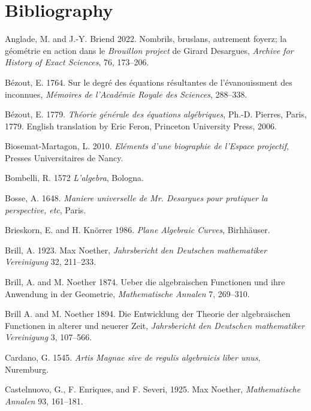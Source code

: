 \section*{Bibliography}
\def\newline{\par\hangindent=10pt\hangafter=1}
\parindent=0pt %
\small
\newline
\indent Anglade, M. and J.-Y. Briend 2022. Nombrils, bruslans, autrement foyerz; la g\'eom\'etrie en action dans le \emph{Brouillon project} de Girard Desargues, \emph{Archive for History of Exact Sciences}, 76, 173--206.
\newline\indent B\'ezout, E. 1764. Sur le degr\'e des \'equations r\'esultantes de l'\'evanouissment des inconnues, \emph{M\'emoires de l'Acad\'emie Royale des Sciences}, 288--338.
\newline\indent B\'ezout, E. 1779. \emph{Th\'eorie g\'en\'erale des \'equations alg\'ebriques}, Ph.-D. Pierres, Paris, 1779. English translation by Eric Feron, Princeton University Press, 2006.
\newline\indent  Biosemat-Martagon, L. 2010. \emph{El\'ements d'une biographie de l'Espace projectif}, Presses Universitaires de Nancy.
\newline\indent Bombelli, R. 1572 \emph{L'algebra}, Bologna.
\newline\indent Bosse, A.  1648. \emph{Maniere universelle de Mr. Desargues pour pratiquer la perspective, etc}, Paris.
\newline\indent Brieskorn, E. and  H. Kn\"orrer 1986. \emph{Plane Algebraic Curves}, Birhh\"auser.
\newline\indent Brill, A. 1923. Max Noether, \emph{Jahrsbericht den Deutschen mathematiker Vereinigung} 32, 211--233.
\newline\indent Brill, A. and M. Noether  1874.  Ueber die algebraischen Functionen und ihre Anwendung in der Geometrie, \emph{Mathematische Annalen} 7, 269--310.
\newline\indent Brill A. and M. Noether 1894.  Die Entwicklung der Theorie der algebraischen Functionen in alterer und neuerer Zeit, \emph{Jahrsbericht den Deutschen mathematiker Vereinigung} 3, 107--566.
\newline\indent Cardano, G. 1545.  \emph{Artis Magnae sive de regulis algebraicis liber unus}, Nuremburg. 
\newline\indent Castelnuovo, G., F. Enriques, and F. Severi, 1925. Max Noether, \emph{Mathematische Annalen} 93, 161--181.
